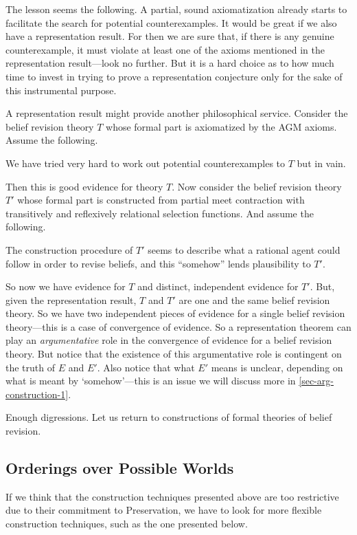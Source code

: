 The lesson seems the following. A partial, sound axiomatization already starts to facilitate the search for potential counterexamples. It would be great if we also have a representation result. For then we are sure that, if there is any genuine counterexample, it must violate at least one of the axioms mentioned in the representation result---look no further. But it is a hard choice as to how much time to invest in trying to prove a representation conjecture only for the sake of this instrumental purpose.

A representation result might provide another philosophical service. Consider the belief revision theory $T$ whose formal part is axiomatized by the AGM axioms. Assume the following. \op

	\im[($E$)] We have tried very hard to work out potential counterexamples to $T$ but in vain. 

\ed Then this is good evidence for theory $T$. Now consider the belief revision theory $T'$ whose formal part is constructed from partial meet contraction with transitively and reflexively relational selection functions. And assume the following. \op

	\im[($E'$)] The construction procedure of $T'$ seems to describe what a rational agent could follow in order to revise beliefs, and this ``somehow'' lends plausibility to $T'$. 

\ed So now we have evidence for $T$ and distinct, independent evidence for $T'$. But, given the representation result, $T$ and $T'$ are one and the same belief revision theory. So we have two independent pieces of evidence for a single belief revision theory---this is a case of convergence of evidence. So a representation theorem can play an {\em argumentative} role in the convergence of evidence for a belief revision theory. But notice that the existence of this argumentative role is contingent on the truth of $E$ and $E'$. Also notice that what $E'$ means is unclear, depending on what is meant by `somehow'---this is an issue we will discuss more in \autoref{sec-arg-construction-1}.

Enough digressions. Let us return to constructions of formal theories of belief revision.

\subsection{Orderings over Possible Worlds}\label{sec-ordering}

If we think that the construction techniques presented above are too restrictive due to their commitment to Preservation, we have to look for more flexible construction techniques, such as the one presented below. 

